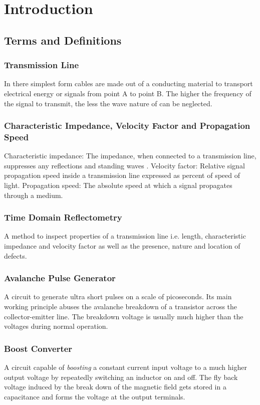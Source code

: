 \chapter{Introduction}
%
\section{Terms and Definitions}
    \subsection*{Transmission Line}\label{sec:transmissionLine}
    In there simplest form cables are made out of a conducting material to transport electrical energy or signals from point
    A to point B. The higher the frequency of the signal to transmit, the less the wave nature of can be neglected.
    \subsection*{Characteristic Impedance, Velocity Factor and Propagation Speed}
    Characteristic impedance: The impedance, when connected to a transmission line, suppresses any reflections and standing
    waves \cite{ATIS.AmericanTelecomStandards2001}.
    Velocity factor: Relative signal propagation speed inside a transmission line expressed as percent of speed of light.
    Propagation speed: The absolute speed at which a signal propagates through a medium.
    \subsection*{Time Domain Reflectometry}
    A method to inspect properties of a transmission line i.e. length, characteristic impedance and velocity factor as
    well as the presence, nature and location of defects.
    \subsection*{Avalanche Pulse Generator}
    A circuit to generate ultra short pulses on a scale of picoseconds. Its main working principle abuses the avalanche
    breakdown of a transistor across the collector-emitter line. The breakdown voltage is usually much higher than the
    voltages during normal operation.
    \subsection*{Boost Converter}
    A circuit capable of \textit{boosting} a constant current input voltage to a much higher output voltage by repeatedly
    switching an inductor on and off. The fly back voltage induced by the break down of the magnetic field gets stored in
    a capacitance and forms the voltage at the output terminals.
